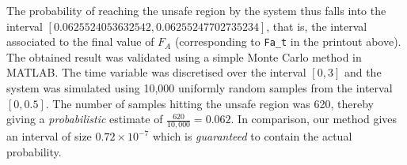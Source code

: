 The probability of reaching the unsafe region by the system thus falls into the interval 
$[0.0625524053632542, 0.06255247702735234]$, that is, the interval associated to the final 
value of $F_A$ (corresponding to \verb#Fa_t# in the printout above). The obtained result was 
validated using a simple Monte Carlo method in MATLAB. The time variable was discretised over 
the interval $[0, 3]$ and the system was simulated using 10,000 uniformly random samples from 
the interval $[0, 0.5]$. The number of samples hitting the unsafe region was 620, thereby 
giving a {\em probabilistic} estimate of $\frac{620}{10,000}= 0.062$. In comparison, our method 
gives an interval of size $0.72\times 10^{-7}$ which is {\em guaranteed} to contain the actual 
probability.

